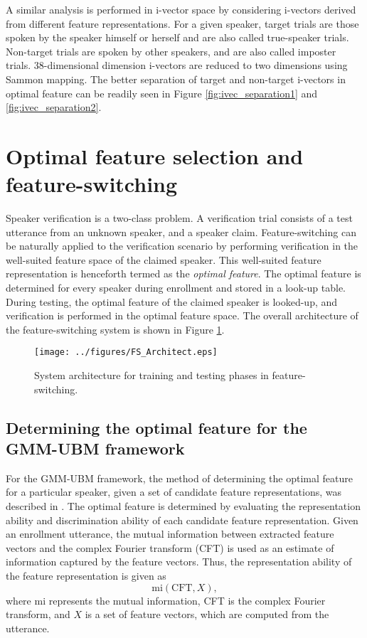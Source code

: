 \documentclass[preprint,12pt,5p]{elsarticle}
\begin{document}
A similar analysis is performed in i-vector space by considering i-vectors derived
from different feature representations.  For a given speaker, target trials are
those spoken by the speaker himself or herself and are also called true-speaker
trials. Non-target trials are spoken by other speakers, and are also called
imposter trials. 38-dimensional dimension i-vectors are reduced
to two dimensions using Sammon mapping. The better separation of target and
non-target i-vectors in optimal feature  can be readily seen in Figure
\ref{fig:ivec_separation1} and \ref{fig:ivec_separation2}.  

\section{Optimal feature selection and feature-switching}
\label{sec:optFeat}
Speaker verification is a two-class problem. A verification trial consists of a
test utterance from an unknown speaker, and a speaker claim. Feature-switching
can be naturally applied to the verification scenario by performing
verification in the well-suited feature space of the claimed speaker. This
well-suited feature representation is henceforth termed as the \emph{optimal
feature}. The optimal feature is determined for every speaker
during enrollment and stored in a look-up table. During testing, the optimal
feature of the claimed speaker is looked-up, and verification is performed in
the optimal feature space. The overall architecture of the feature-switching system 
is shown in Figure \ref{fig:systemArch}. 

\begin{figure}[th]
\centering
\texttt{[image: ../figures/FS\_Architect.eps]}
\caption{System architecture for training and testing phases in feature-switching.}
\label{fig:systemArch}
\end{figure}

\subsection{Determining the optimal feature for the GMM-UBM framework}
\label{subsec:ubm_optFeat}

For the GMM-UBM framework, the method of determining the optimal feature for a
particular speaker, given a set of candidate feature representations, was
described in \cite{padmanInterspeech2010}. The optimal feature is determined by
evaluating the representation ability and discrimination ability
of each candidate feature representation. Given an enrollment utterance, the
mutual information between extracted feature vectors and the complex Fourier
transform (CFT) is used as an estimate of information captured by the feature
vectors. Thus, the representation ability of the feature representation is given
as 
\begin{equation}
\textrm{mi}(\textrm{CFT},X),
\end{equation}
where $\textrm{mi}$ represents the mutual information, CFT is the complex
Fourier transform, and $X$ is a set of feature vectors, which are computed from
the utterance.
\end{document}
